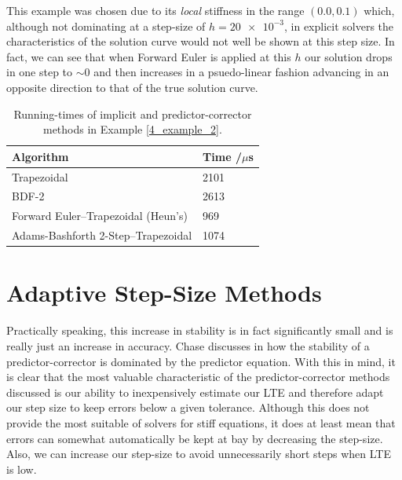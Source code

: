 \documentclass[12pt, twoside]{report}
\theoremstyle{plain}
\theoremstyle{definition}
\theoremstyle{definition}
\begin{document}
        This example was chosen due to its \textit{local} stiffness in the 
        range $(0.0, 0.1)$ which, although not dominating at a step-size of 
        $h=\num{20e-3}$, in explicit solvers the characteristics of the solution
        curve would not well be shown at this step size. In fact, we can see that
        when Forward Euler is applied at this $h$ our solution drops in one step
        to ${\sim}0$ and then increases in a psuedo-linear fashion advancing in an
        opposite direction to that of the true solution curve. 

        \begin{table}
            \centering
                \begin{tabular}[H]{| l | l |}
                    \hline
                    Algorithm & Time /$\mu$s \\ \hline
                    Trapezoidal & 2101 \\ \hline
                    BDF-2 & 2613 \\ \hline
                    Forward Euler--Trapezoidal (Heun's) & 969 \\ \hline
                    Adams-Bashforth 2-Step--Trapezoidal & 1074 \\
                    \hline
                \end{tabular}
            \label{4_im_pc_runtimes}
            \caption{Running-times of implicit and predictor-corrector methods in Example
            \ref{4_example_2}.}
        \end{table}

    \section{Adaptive Step-Size Methods}
    \label{4_adaptive}
        Practically speaking, this increase in stability is in fact 
        significantly small and is really just an increase in accuracy. Chase
        discusses in \cite{chase} how the stability of a predictor-corrector
        is dominated by the predictor equation. With this in mind, it is 
        clear that the most valuable characteristic of the predictor-corrector
        methods discussed is our ability to inexpensively estimate our LTE
        and therefore adapt our step size to keep errors below a given 
        tolerance. Although this does not provide the most suitable of solvers
        for stiff equations, it does at least mean that errors can somewhat 
        automatically be kept at bay by decreasing the step-size. Also, we can
        increase our step-size to avoid unnecessarily short steps when LTE is 
        low.
\end{document}
